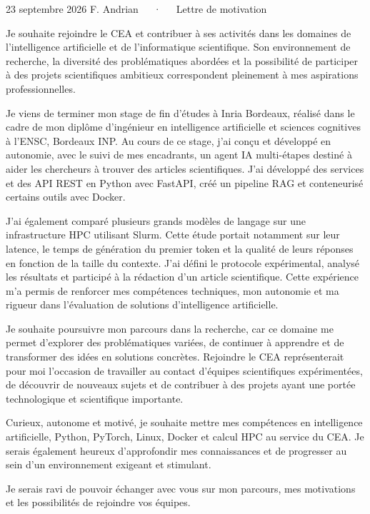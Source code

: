 \documentclass[11pt, a4paper]{awesome-cv}
\begin{document}
\makecvheader[R]
\makecvfooter
  {23 septembre 2026}
  {F. Andrian~~~·~~~Lettre de motivation}
  {}

\makelettertitle

\begin{cvletter}

Je souhaite rejoindre le CEA et contribuer à ses activités dans les domaines de l’intelligence artificielle et de l’informatique scientifique. Son environnement de recherche, la diversité des problématiques abordées et la possibilité de participer à des projets scientifiques ambitieux correspondent pleinement à mes aspirations professionnelles.

Je viens de terminer mon stage de fin d’études à Inria Bordeaux, réalisé dans le cadre de mon diplôme d’ingénieur en intelligence artificielle et sciences cognitives à l’ENSC, Bordeaux INP. Au cours de ce stage, j’ai conçu et développé en autonomie, avec le suivi de mes encadrants, un agent IA multi-étapes destiné à aider les chercheurs à trouver des articles scientifiques. J’ai développé des services et des API REST en Python avec FastAPI, créé un pipeline RAG et conteneurisé certains outils avec Docker.

J’ai également comparé plusieurs grands modèles de langage sur une infrastructure HPC utilisant Slurm. Cette étude portait notamment sur leur latence, le temps de génération du premier token et la qualité de leurs réponses en fonction de la taille du contexte. J’ai défini le protocole expérimental, analysé les résultats et participé à la rédaction d’un article scientifique. Cette expérience m’a permis de renforcer mes compétences techniques, mon autonomie et ma rigueur dans l’évaluation de solutions d’intelligence artificielle.

Je souhaite poursuivre mon parcours dans la recherche, car ce domaine me permet d’explorer des problématiques variées, de continuer à apprendre et de transformer des idées en solutions concrètes. Rejoindre le CEA représenterait pour moi l’occasion de travailler au contact d’équipes scientifiques expérimentées, de découvrir de nouveaux sujets et de contribuer à des projets ayant une portée technologique et scientifique importante.

Curieux, autonome et motivé, je souhaite mettre mes compétences en intelligence artificielle, Python, PyTorch, Linux, Docker et calcul HPC au service du CEA. Je serais également heureux d’approfondir mes connaissances et de progresser au sein d’un environnement exigeant et stimulant.

Je serais ravi de pouvoir échanger avec vous sur mon parcours, mes motivations et les possibilités de rejoindre vos équipes.

\end{cvletter}

\makeletterclosing
\end{document}

